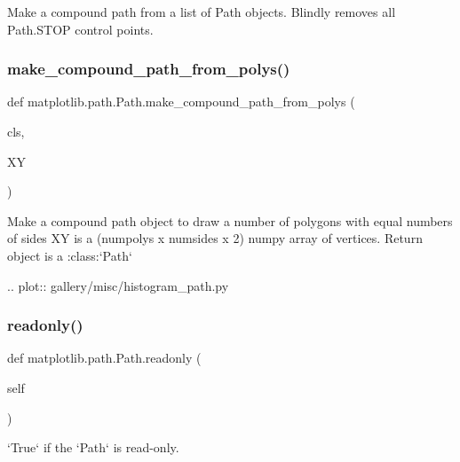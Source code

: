 \begin{DoxyVerb}Make a compound path from a list of Path objects. Blindly removes all
Path.STOP control points.
\end{DoxyVerb}
 \mbox{\label{classmatplotlib_1_1path_1_1Path_a082efc37cf9eaabafb4e1300fa2ed7df}} 
\subsubsection{\texorpdfstring{make\+\_\+compound\+\_\+path\+\_\+from\+\_\+polys()}{make\_compound\_path\_from\_polys()}}
{\footnotesize\ttfamily def matplotlib.\+path.\+Path.\+make\+\_\+compound\+\_\+path\+\_\+from\+\_\+polys (\begin{DoxyParamCaption}\item[{}]{cls,  }\item[{}]{XY }\end{DoxyParamCaption})}

\begin{DoxyVerb}Make a compound path object to draw a number
of polygons with equal numbers of sides XY is a (numpolys x
numsides x 2) numpy array of vertices.  Return object is a
:class:`Path`

.. plot:: gallery/misc/histogram_path.py\end{DoxyVerb}
 \mbox{\label{classmatplotlib_1_1path_1_1Path_aaed6949dcf8a429992d3056abf8e2bc8}} 
\subsubsection{\texorpdfstring{readonly()}{readonly()}}
{\footnotesize\ttfamily def matplotlib.\+path.\+Path.\+readonly (\begin{DoxyParamCaption}\item[{}]{self }\end{DoxyParamCaption})}

\begin{DoxyVerb}`True` if the `Path` is read-only.
\end{DoxyVerb}
 \mbox{\label{classmatplotlib_1_1path_1_1Path_ac6c55e72a1c976f2d7a5d59aea72428d}} 
